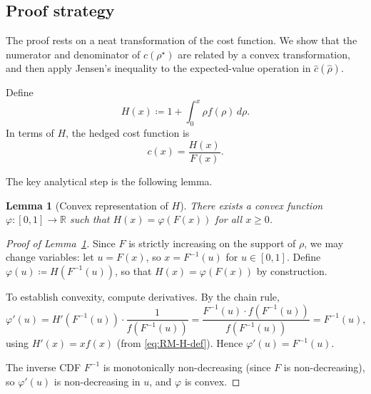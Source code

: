 \documentclass[11pt,a4paper,oneside]{book}
\def\R{\mathbb{R}}
\def\geq{\geqslant}
\theoremstyle{plain}
\newtheorem{lemma}[theorem]{Lemma}
\theoremstyle{definition}
\theoremstyle{remark}
\numberwithin{equation}{chapter}
\begin{document}
\subsection{Proof strategy}

The proof rests on a neat transformation of the cost function.
We show that the numerator and denominator of $c(\rho^\star)$ are related by a convex transformation, and then apply Jensen's inequality to the expected-value operation in $\widehat{c}(\widehat{\rho})$.

Define
\begin{equation}\label{eq:RM-H-def}
  H(x) \coloneqq 1 + \int_0^x \rho f(\rho) \, d\rho.
\end{equation}
In terms of $H$, the hedged cost function is
\begin{equation}\label{eq:RM-c-via-H}
  c(x) = \frac{H(x)}{F(x)}.
\end{equation}

The key analytical step is the following lemma.

\begin{lemma}[Convex representation of $H$]\label{lem:RM-convex}
There exists a convex function $\varphi : [0, 1] \to \R$ such that $H(x) = \varphi(F(x))$ for all $x \geq 0$.
\end{lemma}

\begin{proof}[Proof of Lemma~\ref{lem:RM-convex}]
Since $F$ is strictly increasing on the support of $\rho$, we may change variables: let $u = F(x)$, so $x = F^{-1}(u)$ for $u \in [0, 1]$.
Define $\varphi(u) \coloneqq H(F^{-1}(u))$, so that $H(x) = \varphi(F(x))$ by construction.

To establish convexity, compute derivatives.
By the chain rule,
\begin{equation*}
  \varphi'(u) = H'(F^{-1}(u)) \cdot \frac{1}{f(F^{-1}(u))}
  = \frac{F^{-1}(u) \cdot f(F^{-1}(u))}{f(F^{-1}(u))}
  = F^{-1}(u),
\end{equation*}
using $H'(x) = x f(x)$ (from \eqref{eq:RM-H-def}).
Hence $\varphi'(u) = F^{-1}(u)$.

The inverse CDF $F^{-1}$ is monotonically non-decreasing (since $F$ is non-decreasing), so $\varphi'(u)$ is non-decreasing in $u$, and $\varphi$ is convex.
\end{proof}
\end{document}
